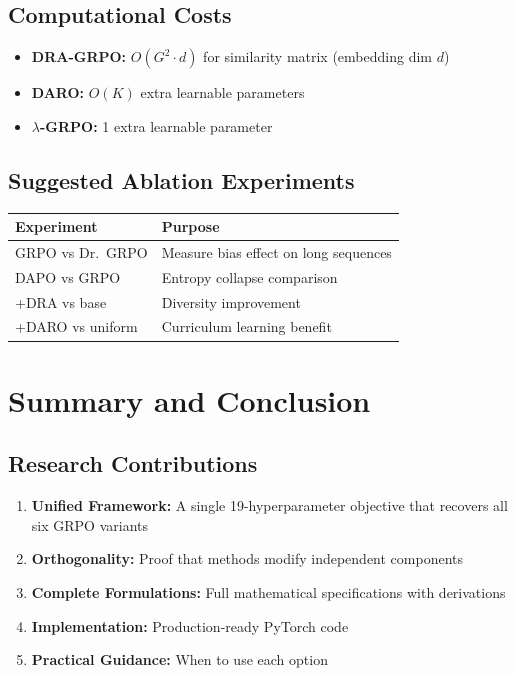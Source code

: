 \documentclass[11pt,a4paper]{article}
\begin{document}
\subsection{Computational Costs}

\begin{itemize}
    \item \textbf{DRA-GRPO:} $O(G^2 \cdot d)$ for similarity matrix (embedding dim $d$)
    \item \textbf{DARO:} $O(K)$ extra learnable parameters
    \item \textbf{$\lambda$-GRPO:} 1 extra learnable parameter
\end{itemize}

\subsection{Suggested Ablation Experiments}

\begin{center}
\begin{tabular}{@{}ll@{}}
\toprule
\textbf{Experiment} & \textbf{Purpose} \\
\midrule
GRPO vs Dr.~GRPO & Measure bias effect on long sequences \\
DAPO vs GRPO & Entropy collapse comparison \\
+DRA vs base & Diversity improvement \\
+DARO vs uniform & Curriculum learning benefit \\
\bottomrule
\end{tabular}
\end{center}

\newpage


\section{Summary and Conclusion}

\subsection{Research Contributions}

\begin{enumerate}
    \item \textbf{Unified Framework:} A single 19-hyperparameter objective that recovers all six GRPO variants
    \item \textbf{Orthogonality:} Proof that methods modify independent components
    \item \textbf{Complete Formulations:} Full mathematical specifications with derivations
    \item \textbf{Implementation:} Production-ready PyTorch code
    \item \textbf{Practical Guidance:} When to use each option
\end{enumerate}
\end{document}
